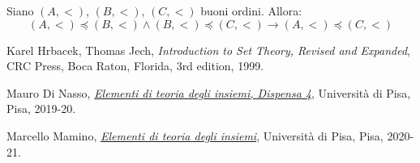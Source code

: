 \documentclass[11pt]{scrartcl}
\begin{document}
\begin{remark}
	Siano $(A,<)$, $(B,<)$, $(C,<)$ buoni ordini. Allora:
	\[ (A,<) \preceq (B,<) \land (B,<) \preceq (C,<) \rightarrow (A,<) \preceq (C,<)
		\]
\end{remark}


















































\pagebreak
\begin{thebibliography}{9}
	Karel Hrbacek, Thomas Jech,
	\textit{Introduction to Set Theory, Revised and Expanded},
	CRC Press, Boca Raton, Florida,
	3rd edition,
	1999.

	Mauro Di Nasso,
	\href{https://people.dm.unipi.it/dinasso/ETI/dispensa-04ss.pdf}{\textit{Elementi di teoria degli insiemi, Dispensa 4}},
	Università di Pisa, Pisa,
	2019-20.


	Marcello Mamino,
	\href{https://ciovil.li/eti20/}{\textit{Elementi di teoria degli insiemi}},
	Università di Pisa, Pisa,
	2020-21.
\end{thebibliography}
\end{document}

